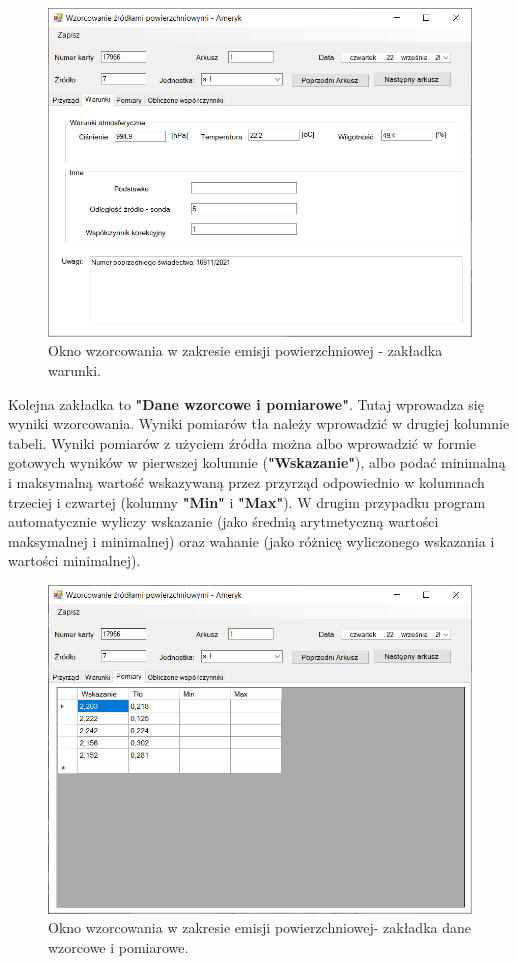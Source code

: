 	\begin{figure}[htb]
		\centering
		\includegraphics[width=\columnwidth]{obrazki/Wzorcowanie/emisja/warunki.png}
		\caption{Okno wzorcowania w zakresie emisji powierzchniowej - zakładka warunki.}
		\label{emisjaWarunki}
	\end{figure}
	
	Kolejna zakładka to \textbf{"Dane wzorcowe i pomiarowe"}. Tutaj wprowadza się wyniki wzorcowania. Wyniki pomiarów tła należy wprowadzić w drugiej kolumnie tabeli. Wyniki pomiarów z użyciem źródła można albo wprowadzić w formie gotowych wyników w pierwszej kolumnie (\textbf{"Wskazanie"}), albo podać minimalną i maksymalną wartość wskazywaną przez przyrząd odpowiednio w kolumnach trzeciej i czwartej (kolumny \textbf{"Min"} i \textbf{"Max"}). W drugim przypadku program automatycznie wyliczy wskazanie (jako średnią arytmetyczną wartości maksymalnej i minimalnej) oraz wahanie (jako różnicę wyliczonego wskazania i wartości minimalnej).
	
	\begin{figure}[htb]
		\centering
		\includegraphics[width=\columnwidth]{obrazki/Wzorcowanie/emisja/dane.png}
		\caption{Okno wzorcowania w zakresie emisji powierzchniowej- zakładka dane wzorcowe i pomiarowe.}
		\label{emisjaDane}
	\end{figure}
	
